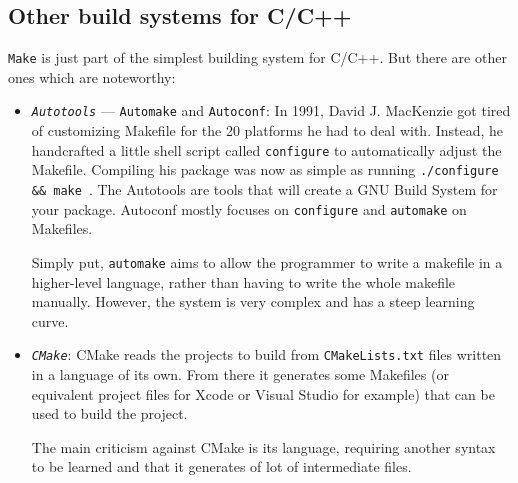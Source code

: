 \subsection{Other build systems for C/C++}
\label{sec:other-build-systems}
\texttt{Make} is just part of the simplest building system for C/C++. But there
are other ones which are noteworthy\cite{c++buildSystems}:
\begin{itemize}
\item \emph{\texttt{Autotools}} --- \texttt{Automake} and \texttt{Autoconf}:
In 1991, David J. MacKenzie got tired of customizing Makefile for the 20
platforms he had to deal with. Instead, he handcrafted a little shell script
called \texttt{configure} to automatically adjust the Makefile.
Compiling his package was now as simple as running \texttt{./configure \&\&
  make}~\cite{automakeManual}. The Autotools are tools that will create a GNU Build System for your
package. Autoconf mostly focuses on \texttt{configure} and \texttt{automake} on Makefiles.

Simply put, \texttt{automake} aims to allow the programmer to write a makefile
in a higher-level language, rather than having to write the whole makefile
manually.
However, the system is very complex and has a steep learning curve.
\item \emph{\texttt{CMake}}:
CMake reads the projects to build from \texttt{CMakeLists.txt} files written in a language of its own. From there it generates some Makefiles (or equivalent project files for Xcode or Visual Studio for example) that can be used to build the project.

The main criticism against CMake is its language, requiring another syntax to be
learned and that it generates of lot of intermediate files.
\end{itemize}
%
